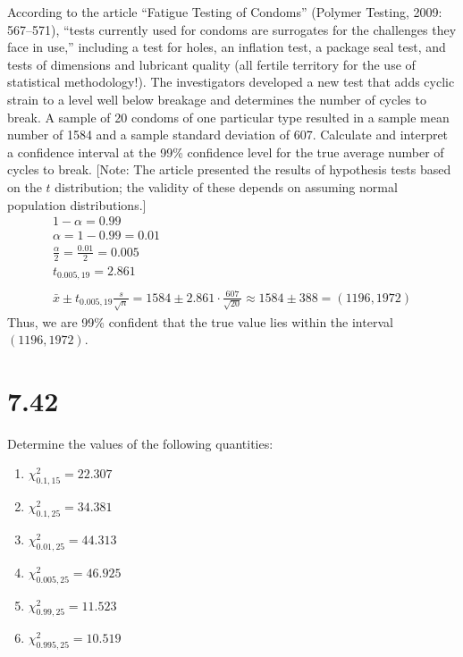 \documentclass[letterpaper,12pt,fleqn]{article}
\renewcommand{\a}{\alpha}
\newcommand{\td}[2]{t_{{#1},{#2}}}
\newcommand{\X}{\chi}
\newcommand{\Xs}{\X^2}
\newcommand{\xd}[2]{\Xs_{{#1},{#2}}}
\begin{document}
According to the article ``Fatigue Testing of Condoms'' (Polymer Testing, 2009: 567--571), ``tests currently used for condoms
are surrogates for the challenges they face in use,'' including a test for holes, an inflation test, a package seal test, and
tests of dimensions and lubricant quality (all fertile territory for the use of statistical methodology!).  The investigators
developed a new test that adds cyclic strain to a level well below breakage and determines the number of cycles to break.  A
sample of 20 condoms of one particular type resulted in a sample mean number of 1584 and a sample standard deviation of 607.
Calculate and interpret a confidence interval at the 99\% confidence level for the true average number of cycles to
break. [Note: The article presented the results of hypothesis tests based on the \(t\) distribution; the validity of these
  depends on assuming normal population distributions.]
\begin{gather*}
  1-\a=0.99 \\
  \a=1-0.99=0.01 \\
  \frac{\a}{2}=\frac{0.01}{2}=0.005 \\
  \td{0.005}{19}=2.861 \\
  \\
  \bar{x}\pm\td{0.005}{19}\frac{s}{\sqrt{n}}=1584\pm2.861\cdot\frac{607}{\sqrt{20}}\approx1584\pm388=(1196,1972)
\end{gather*}
Thus, we are 99\% confident that the true value lies within the interval \((1196,1972)\).

\section*{7.42}

Determine the values of the following quantities:
\begin{enumerate}[label={\alph*)}]
\item \(\xd{0.1}{15}=22.307\)
\item \(\xd{0.1}{25}=34.381\)
\item \(\xd{0.01}{25}=44.313\)
\item \(\xd{0.005}{25}=46.925\)
\item \(\xd{0.99}{25}=11.523\)
\item \(\xd{0.995}{25}=10.519\)
\end{enumerate}
\end{document}
